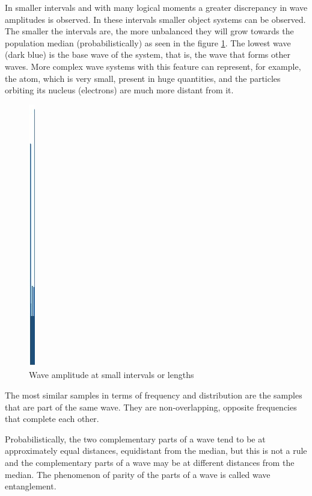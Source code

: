 In smaller intervals and with many logical moments a greater discrepancy in wave amplitudes is observed. In these intervals smaller object systems can be observed. The smaller the intervals are, the more unbalanced they will grow towards the population median (probabilistically) as seen in the figure \ref{fig:consciousness_space_subconsciousness_min}. The lowest wave (dark blue) is the base wave of the system, that is, the wave that forms other waves. More complex wave systems with this feature can represent, for example, the atom, which is very small, present in huge quantities, and the particles orbiting its nucleus (electrons) are much more distant from it.
	\begin{figure}[H]
	\caption{Wave amplitude at small intervals or lengths}
	\label{fig:consciousness_space_subconsciousness_min}
	\centering
	\includegraphics[scale=.45]{sections/images/consciousness_space_subconsciousness_min.jpg}
	\end{figure}

The most similar samples in terms of frequency and distribution are the samples that are part of the same wave. They are non-overlapping, opposite frequencies that complete each other.

Probabilistically, the two complementary parts of a wave tend to be at approximately equal distances, equidistant from the median, but this is not a rule and the complementary parts of a wave may be at different distances from the median. The phenomenon of parity of the parts of a wave is called wave entanglement.


